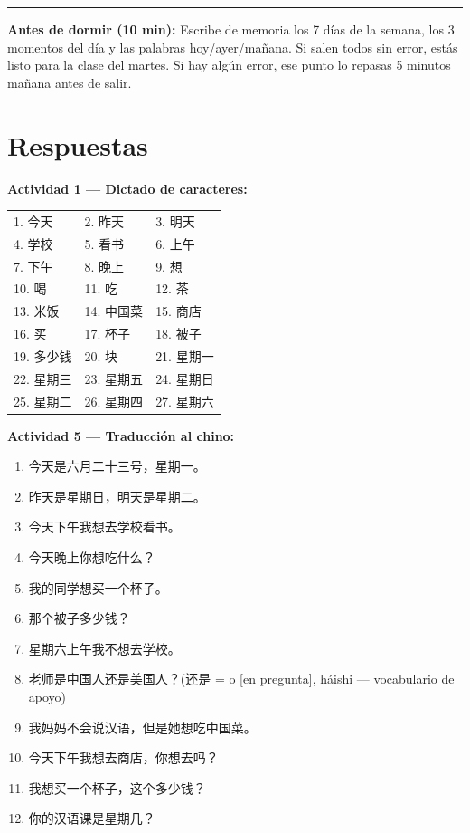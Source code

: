 \documentclass[12pt, a4paper]{article}
\begin{document}
\vspace{1em}
\hrule
\vspace{0.5em}

\begin{cuadroverde}
\textbf{Antes de dormir (10 min):} Escribe de memoria los 7 días de la semana, los 3 momentos del día y las palabras hoy/ayer/mañana. Si salen todos sin error, estás listo para la clase del martes. Si hay algún error, ese punto lo repasas 5 minutos mañana antes de salir.
\end{cuadroverde}

\newpage
\section*{\textcolor{rojosuave}{Respuestas}}

\textbf{Actividad 1 — Dictado de caracteres:}\\
\begin{tabular}{lll}
1. 今天 & 2. 昨天 & 3. 明天 \\
4. 学校 & 5. 看书 & 6. 上午 \\
7. 下午 & 8. 晚上 & 9. 想 \\
10. 喝 & 11. 吃 & 12. 茶 \\
13. 米饭 & 14. 中国菜 & 15. 商店 \\
16. 买 & 17. 杯子 & 18. 被子 \\
19. 多少钱 & 20. 块 & 21. 星期一 \\
22. 星期三 & 23. 星期五 & 24. 星期日 \\
25. 星期二 & 26. 星期四 & 27. 星期六 \\
\end{tabular}

\vspace{1em}
\textbf{Actividad 5 — Traducción al chino:}
\begin{enumerate}[leftmargin=1.5cm]
\item 今天是六月二十三号，星期一。
\item 昨天是星期日，明天是星期二。
\item 今天下午我想去学校看书。
\item 今天晚上你想吃什么？
\item 我的同学想买一个杯子。
\item 那个被子多少钱？
\item 星期六上午我不想去学校。
\item 老师是中国人还是美国人？\quad (还是 = o [en pregunta], háishi — vocabulario de apoyo)
\item 我妈妈不会说汉语，但是她想吃中国菜。
\item 今天下午我想去商店，你想去吗？
\item 我想买一个杯子，这个多少钱？
\item 你的汉语课是星期几？
\end{enumerate}
\end{document}
